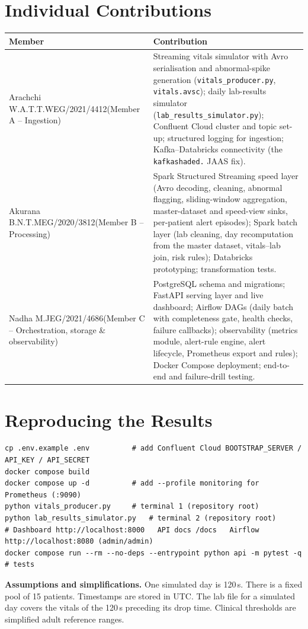 \documentclass[11pt,a4paper]{article}
\newcommand{\code}[1]{\nolinkurl{#1}}
\begin{document}
\appendix
\section{Individual Contributions}
\begin{table}[!ht]
\centering\small
\begin{tabularx}{\textwidth}{@{}P{3.6cm}L@{}}
\toprule
\textbf{Member} & \textbf{Contribution} \\
\midrule
Arachchi W.A.T.T.W\newline EG/2021/4412\newline (Member A -- Ingestion) &
Streaming vitals simulator with Avro serialisation and abnormal-spike generation
(\code{vitals_producer.py}, \code{vitals.avsc}); daily lab-results simulator
(\code{lab_results_simulator.py}); Confluent Cloud cluster and topic set-up; structured logging
for ingestion; Kafka--Databricks connectivity (the \code{kafkashaded.} JAAS fix). \\
Akurana B.N.T.M\newline EG/2020/3812\newline (Member B -- Processing) &
Spark Structured Streaming speed layer (Avro decoding, cleaning, abnormal flagging, sliding-window
aggregation, master-dataset and speed-view sinks, per-patient alert episodes); Spark batch layer
(lab cleaning, day recomputation from the master dataset, vitals--lab join, risk rules);
Databricks prototyping; transformation tests. \\
Nadha M.J\newline EG/2021/4686\newline (Member C -- Orchestration, storage \& observability) &
PostgreSQL schema and migrations; FastAPI serving layer and live dashboard; Airflow DAGs (daily
batch with completeness gate, health checks, failure callbacks); observability (metrics module,
alert-rule engine, alert lifecycle, Prometheus export and rules); Docker Compose deployment;
end-to-end and failure-drill testing. \\
\bottomrule
\end{tabularx}
\end{table}

\section{Reproducing the Results}
\begin{lstlisting}
cp .env.example .env          # add Confluent Cloud BOOTSTRAP_SERVER / API_KEY / API_SECRET
docker compose build
docker compose up -d          # add --profile monitoring for Prometheus (:9090)
python vitals_producer.py     # terminal 1 (repository root)
python lab_results_simulator.py   # terminal 2 (repository root)
# Dashboard http://localhost:8000   API docs /docs   Airflow http://localhost:8080 (admin/admin)
docker compose run --rm --no-deps --entrypoint python api -m pytest -q   # tests
\end{lstlisting}

\textbf{Assumptions and simplifications.} One simulated day is 120\,s. There is a fixed pool of 15
patients. Timestamps are stored in UTC. The lab file for a simulated day covers the vitals of the
120\,s preceding its drop time. Clinical thresholds are simplified adult reference ranges.
\end{document}
